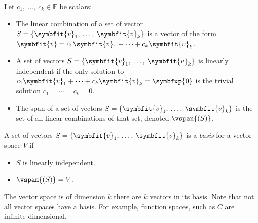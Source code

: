 \documentclass{article}
\begin{document}
Let \(c_1,\: \dots,\: c_k \in \mathbb{F}\) be scalars:
\begin{itemize}
    \item The linear combination of a set of vector \(S = \left\{ \symbfit{v}_1,\: \dots,\: \symbfit{v}_k \right\}\)
          is a vector of the form \(\symbfit{v} = c_1 \symbfit{v}_1 + \cdots + c_k \symbfit{v}_k\).
    \item A set of vectors \(S = \left\{ \symbfit{v}_1,\: \dots,\: \symbfit{v}_k \right\}\) is linearly independent if
          the only solution to \(c_1 \symbfit{v}_1 + \cdots + c_k \symbfit{v}_k = \symbfup{0}\) is the trivial solution \(c_1 = \cdots = c_k = 0\).
    \item The span of a set of vectors \(S = \left\{ \symbfit{v}_1,\: \dots,\: \symbfit{v}_k \right\}\) is the set of all linear combinations of
          that set, denoted \(\vspan{\left( S \right)}\).
\end{itemize}
A set of vectors \(S = \left\{ \symbfit{v}_1,\: \dots,\: \symbfit{v}_k \right\}\) is a \textit{basis} for a vector space \(V\) if
\begin{itemize}
    \item \(S\) is linearly independent.
    \item \(\vspan{\left( S \right)} = V\).
\end{itemize}
The vector space is of dimension \(k\) there are \(k\) vectors in its basis. Note that not all vector spaces have a basis. For example, function spaces, such as \(C\)
are infinite-dimensional.
\end{document}
